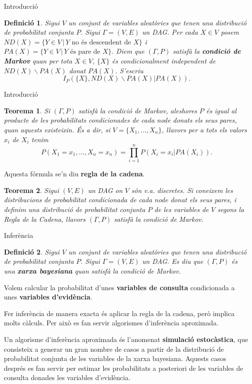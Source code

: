 \documentclass{beamer}
\newtheorem{teorema}{Teorema}
\newtheorem{definicio}{Definici\'{o}}
\theoremstyle{definition}
\begin{document}
\begin{frame}{Introducci\'{o}}
\begin{definicio}
Sigui $V$ un conjunt de variables aleat\`{o}ries que tenen una distribuci\'{o} de probabilitat conjunta $P$. Sigui $\Gamma=(V,E)$ un DAG. Per cada $X\in V$ posem $ND(X)=\{Y\in V\,|\,Y\text{ no \'{e}s descendent de }X\}$ i $PA(X)=\{Y\in V\,|\,Y\text{ \'{e}s pare de }X\}$. \pause Diem que $(\Gamma,P)$ satisf\`{a} la \textbf{condici\'{o} de Markov} quan per tota $X\in V$, $\{X\}$ \'{e}s condicionalment independent de $ND(X)\backslash PA(X)$ donat $PA(X)$. S'escriu
\[I_P(\{X\},ND(X)\backslash PA(X)|PA(X)).\]
\end{definicio}
\end{frame}

\begin{frame}{Introducci\'{o}}
\begin{teorema}
Si $(\Gamma,P)$ satisf\`{a} la condici\'{o} de Markov, aleshores $P$ \'{e}s igual al producte de les probabilitats condicionades de cada node donats els seus pares, quan aquests existeixin. \'{E}s a dir, si $V=\{X_1,\ldots,X_n\}$, llavors per a tots els valors $x_i$ de $X_i$ tenim
\[P(X_1=x_1,\ldots,X_n=x_n)=\prod_{i=1}^nP(X_i=x_i|PA(X_i)).\]
\end{teorema}
\pause
Aquesta f\'{o}rmula se'n diu \textbf{regla de la cadena}.
\pause
\begin{teorema}
Sigui $(V,E)$ un DAG on $V$ s\'{o}n v.a. discretes. Si coneixem les distribucions de probabilitat condicionada de cada node donat els seus pares, i definim una distribuci\'{o} de probabilitat conjunta $P$ de les variables de $V$ segons la Regla de la Cadena, llavors $(\Gamma,P)$ satisf\`{a} la condici\'{o} de Markov.
\end{teorema}
\end{frame}

\begin{frame}{Infer\`{e}ncia}
\begin{definicio}
Sigui $V$ un conjunt de variables aleat\`{o}ries que tenen una distribuci\'{o} de probabilitat conjunta $P$. Sigui $\Gamma=(V,E)$ un DAG. Es diu que $(\Gamma,P)$ \'{e}s una \textbf{xarxa bayesiana} quan satisf\`{a} la condici\'{o} de Markov.
\end{definicio}
\pause
Volem calcular la probabilitat d'unes \textbf{variables de consulta} condicionada a unes \textbf{variables d'evid\`{e}ncia}.
\pause

Fer infer\`{e}ncia de manera exacta \'{e}s aplicar la regla de la cadena, per\`{o} implica molts c\`{a}lculs. Per aix\`{o} es fan servir algorismes d'infer\`{e}ncia aproximada.
\pause

Un algorisme d'infer\`{e}ncia aproximada \'{e}s l'anomenat \textbf{simulaci\'{o} estoc\`{a}stica}, que consisteix a generar un gran nombre de casos a partir de la distribuci\'{o} de probabilitat conjunta de les variables de la xarxa bayesiana. Aquests casos despr\'{e}s es fan servir per estimar les probabilitats a posteriori de les variables de consulta donades les variables d'evid\`{e}ncia.
\end{frame}
\end{document}
